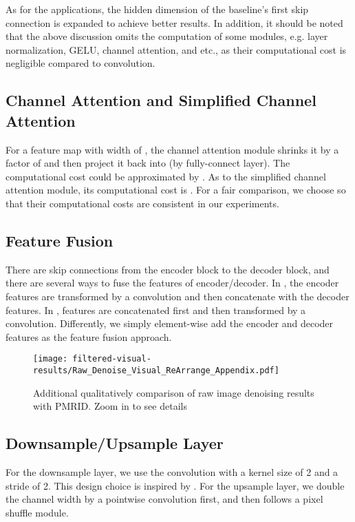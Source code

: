 \documentclass[runningheads]{llncs}
\begin{document}
As for the applications, the hidden dimension of the baseline's first skip connection is expanded to achieve better results. In addition, it should be noted that the above discussion omits the computation of some modules, e.g. layer normalization, GELU, channel attention, and etc., as their computational cost is negligible compared to convolution.

\subsection{Channel Attention and Simplified Channel Attention}
For a feature map with width of ,  the channel attention module shrinks it by a factor of  and then project it back into  (by fully-connect layer). The computational cost could be approximated by . As to the simplified channel attention module, its computational cost is . For a fair comparison, we choose  so that their computational costs are consistent in our experiments.

\subsection{Feature Fusion}
There are skip connections from the encoder block to the decoder block, and there are several ways to fuse the features of encoder/decoder. In \cite{chen2021hinet}, the encoder features are transformed by a convolution and then concatenate with the decoder features. In \cite{zamir2021restormer}, features are concatenated first and then transformed by a convolution. Differently, we simply element-wise add the encoder and decoder features as the feature fusion approach.

\begin{figure*}[!t]
\texttt{[image: filtered-visual-results/Raw\_Denoise\_Visual\_ReArrange\_Appendix.pdf]}
\caption{Additional qualitatively comparison of raw image denoising results with PMRID\cite{wang2020practical}. Zoom in to see details}
\label{fig:more-Raw-Denoise-Visual}
\end{figure*}


\subsection{Downsample/Upsample Layer}
For the downsample layer, we use the convolution with a kernel size of 2 and a stride of 2. This design choice is inspired by \cite{alsallakh2020mind}. 
For the upsample layer, we double the channel width by a pointwise convolution first, and then follows a pixel shuffle module\cite{shi2016real}.
\end{document}
